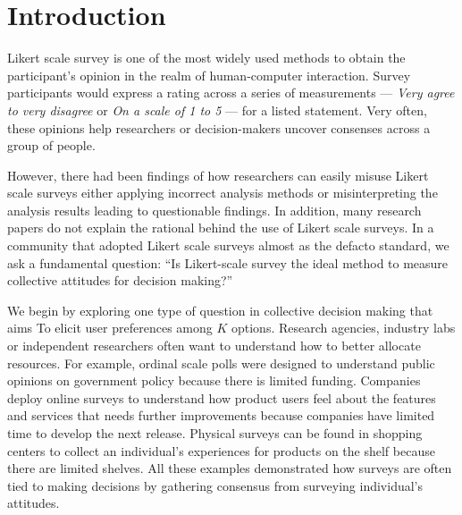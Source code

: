 \section{Introduction}
Likert scale survey 
is one of the most widely used methods
to obtain the participant's opinion
in the realm of human-computer interaction.
Survey participants would express
a rating across a series of measurements ---
\textit{Very agree to very disagree} or
\textit{On a scale of 1 to 5} ---
for a listed statement.
Very often, 
these opinions help
researchers or decision-makers
uncover consenses 
across a group of people.

However, there had been findings of
how researchers can 
easily misuse Likert scale surveys
either applying incorrect analysis methods 
\cite{bishop2015use} 
or misinterpreting the analysis results
\cite{jamieson2004likert, pell2005use}
leading to questionable findings.
In addition, 
many research papers
do not explain the rational
behind the use of 
Likert scale surveys.
In a community that adopted Likert scale surveys
almost as the defacto standard,
we ask a fundamental question: 
``Is Likert-scale survey the ideal method
to measure collective attitudes for decision making?''

We begin by exploring one type of question
in collective decision making that aims To
elicit user preferences among $K$ options.
Research agencies, industry labs or independent researchers
often want to understand how to better allocate resources.
For example, 
ordinal scale polls were designed
to understand public opinions
on government policy \cite{pew}
because there is limited funding.
Companies deploy online surveys 
to understand how product users 
feel about the features and services
that needs further improvements
because companies have limited time 
to develop the next release.
Physical surveys can be found 
in shopping centers 
to collect an individual's experiences
for products on the shelf
because there are limited shelves.
All these examples demonstrated
how surveys are often tied to 
making decisions 
by gathering consensus
from surveying individual's attitudes.


